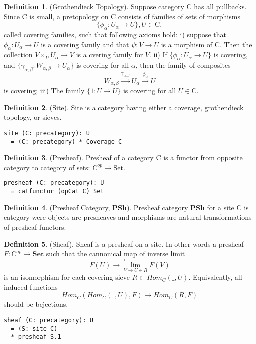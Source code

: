 \documentclass{article}
\theoremstyle{definition}
\newtheorem{definition}{Definition}
\def\mapright#1{\xrightarrow{{#1}}}
\begin{document}
\begin{definition} (Grothendieck Topology).
Suppose category $\mathrm{C}$ has all pullbacks.
Since $\mathrm{C}$ is small, a pretopology on $\mathrm{C}$ consists of families of sets of
morphisms
$$
    \{ \phi_\alpha : U_\alpha \rightarrow U \}, U \in \mathrm{C},
$$
called covering families, such that following axioms hold:
i) suppose that $\phi_\alpha : U_\alpha \rightarrow U$ is a covering family
and that $\psi : V \rightarrow U$ is a morphism of $\mathrm{C}$.
Then the collection $V \times_U U_\alpha \rightarrow V$ is a cvering family for $V$.
ii) If $\{\phi_\alpha : U_\alpha \rightarrow U \}$ is covering,
and $\{\gamma_{\alpha,\beta} : W_{\alpha,\beta} \rightarrow U_\alpha \}$
is covering for all $\alpha$, then the family of composites
$$
    W_{\alpha,\beta} \mapright{\gamma_{\alpha,\beta}} U_\alpha \mapright{\phi_\alpha} U
$$
is covering; iii) The family $\{1: U \rightarrow U\}$ is covering for all $U \in \mathrm{C}$.
\end{definition}

\begin{definition} (Site).
Site is a category having either a coverage, grothendieck topology, or sieves.
\begin{lstlisting}
site (C: precategory): U
  = (C: precategory) * Coverage C
\end{lstlisting}
\end{definition}

\begin{definition} (Presheaf).
Presheaf of a category $\mathrm{C}$ is a functor from opposite category to category of sets:
$\mathrm{C}^{op} \rightarrow \mathrm{Set}$.
\begin{lstlisting}
presheaf (C: precategory): U
  = catfunctor (opCat C) Set
\end{lstlisting}
\end{definition}

\begin{definition} (Presheaf Category, {\bf PSh}).
Presheaf category {\bf PSh} for a site $\mathrm{C}$ is category
were objects are presheaves and morphisms are natural transformations
of presheaf functors.
\end{definition}

\begin{definition} (Sheaf). Sheaf is a presheaf on a site. In other words
a presheaf $F : \mathrm{C}^{op} \rightarrow \mathbf{Set}$ such that the
cannonical map of inverse limit
$$
    F(U) \rightarrow \lim^{\leftarrow}_{V \to U \in R}{F(V)}
$$
is an isomorphism for each covering sieve $R \subset Hom_C(\_,U)$.
Equivalently, all induced functions
$$
    Hom_C(Hom_C(\_,U),F) \rightarrow Hom_C(R,F)
$$
should be bejections.
\begin{lstlisting}
sheaf (C: precategory): U
  = (S: site C)
  * presheaf S.1
\end{lstlisting}
\end{definition}
\end{document}
